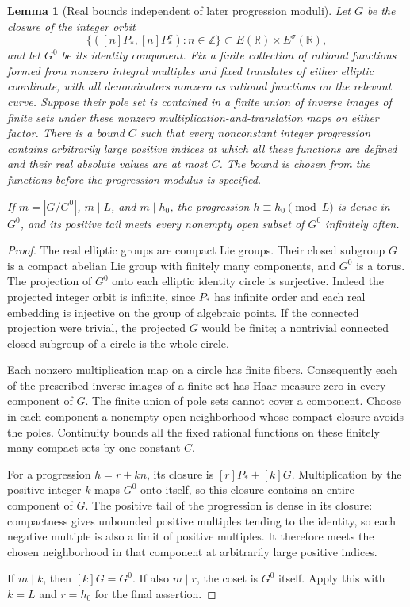 \documentclass[11pt]{article}
\newtheorem{lemma}[theorem]{Lemma}
\theoremstyle{definition}
\theoremstyle{remark}
\newcommand{\Z}{\mathbb Z}
\begin{document}
\begin{lemma}[Real bounds independent of later progression moduli]
\label{v5:real-progression-bridge}
Let $G$ be the closure of the integer orbit
\[
 \{([n]P_*,[n]P_*^\sigma):n\in\Z\}
       \subset E(\mathbb R)\times E^\sigma(\mathbb R),
\]
and let $G^0$ be its identity component. Fix a finite collection of
rational functions formed from nonzero integral multiples and fixed
translates of either elliptic coordinate, with all denominators
nonzero as rational functions on the relevant curve. Suppose their
pole set is contained in a finite union of inverse images of finite
sets under these nonzero multiplication-and-translation maps on
either factor. There is a bound $C$ such that every nonconstant
integer progression contains arbitrarily large positive indices at
which all these functions are defined and their real absolute values
are at most $C$. The bound is chosen from the functions before the
progression modulus is specified.

If $m=|G/G^0|$, $m\mid L$, and $m\mid h_0$, the progression
$h\equiv h_0\pmod L$ is dense in $G^0$, and its positive tail
meets every nonempty open subset of $G^0$ infinitely often.
\end{lemma}

\begin{proof}
The real elliptic groups are compact Lie groups. Their closed
subgroup $G$ is a compact abelian Lie group with finitely many
components, and $G^0$ is a torus. The projection of $G^0$ onto
each elliptic identity circle is surjective. Indeed the projected
integer orbit is infinite, since $P_*$ has infinite order and each
real embedding is injective on the group of algebraic points.
If the connected projection were trivial, the projected $G$ would
be finite; a nontrivial connected closed subgroup of a circle is
the whole circle.

Each nonzero multiplication map on a circle has finite fibers.
Consequently each of the prescribed inverse images of a finite
set has Haar measure zero in every component of $G$. The finite
union of pole sets cannot cover a component. Choose in each
component a nonempty open neighborhood whose compact closure
avoids the poles. Continuity bounds all the fixed rational
functions on these finitely many compact sets by one constant $C$.

For a progression $h=r+kn$, its closure is
$[r]P_*+[k]G$. Multiplication by the positive integer $k$ maps
$G^0$ onto itself, so this closure contains an entire component
of $G$. The positive tail of the progression is dense in its
closure: compactness gives unbounded positive multiples tending
to the identity, so each negative multiple is also a limit of
positive multiples. It therefore meets the chosen neighborhood
in that component at arbitrarily large positive indices.

If $m\mid k$, then $[k]G=G^0$. If also $m\mid r$, the coset
is $G^0$ itself. Apply this with $k=L$ and $r=h_0$ for the final
assertion.
\end{proof}
\end{document}
